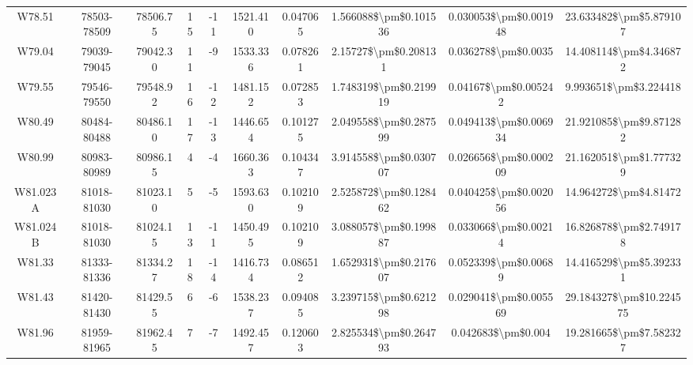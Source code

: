 \documentclass{article}
\begin{document}
\begin{table}[h]
{\begin{tabular}{|c|c|c|c|c|c|c|c|c|c|}
  W78.51 &       78503-78509 &                78506.75 &   15 &  -11 &          1521.410 & 0.047065 & 1.566088\$\textbackslash pm\$0.101536 & 0.030053\$\textbackslash pm\$0.001948 &   23.633482\$\textbackslash pm\$5.879107 \\
  W79.04 &       79039-79045 &                79042.30 &   11 &   -9 &          1533.336 & 0.078261 &  2.15727\$\textbackslash pm\$0.208131 &   0.036278\$\textbackslash pm\$0.0035 &   14.408114\$\textbackslash pm\$4.346872 \\
  W79.55 &       79546-79550 &                79548.92 &   16 &  -12 &          1481.152 & 0.072853 & 1.748319\$\textbackslash pm\$0.219919 &  0.04167\$\textbackslash pm\$0.005242 &    9.993651\$\textbackslash pm\$3.224418 \\
  W80.49 &       80484-80488 &                80486.10 &   17 &  -13 &          1446.654 & 0.101275 & 2.049558\$\textbackslash pm\$0.287599 & 0.049413\$\textbackslash pm\$0.006934 &   21.921085\$\textbackslash pm\$9.871282 \\
  W80.99 &       80983-80989 &                80986.15 &    4 &   -4 &          1660.363 & 0.104347 & 3.914558\$\textbackslash pm\$0.030707 & 0.026656\$\textbackslash pm\$0.000209 &   21.162051\$\textbackslash pm\$1.777329 \\
W81.023A &       81018-81030 &                81023.10 &    5 &   -5 &          1593.630 & 0.102109 & 2.525872\$\textbackslash pm\$0.128462 & 0.040425\$\textbackslash pm\$0.002056 &    14.964272\$\textbackslash pm\$4.81472 \\
W81.024B &       81018-81030 &                81024.15 &   13 &  -11 &          1450.495 & 0.102109 & 3.088057\$\textbackslash pm\$0.199887 &  0.033066\$\textbackslash pm\$0.00214 &   16.826878\$\textbackslash pm\$2.749178 \\
  W81.33 &       81333-81336 &                81334.27 &   18 &  -14 &          1416.734 & 0.086512 & 1.652931\$\textbackslash pm\$0.217607 &  0.052339\$\textbackslash pm\$0.00689 &   14.416529\$\textbackslash pm\$5.392331 \\
  W81.43 &       81420-81430 &                81429.55 &    6 &   -6 &          1538.237 & 0.094085 & 3.239715\$\textbackslash pm\$0.621298 & 0.029041\$\textbackslash pm\$0.005569 &  29.184327\$\textbackslash pm\$10.224575 \\
  W81.96 &       81959-81965 &                81962.45 &    7 &   -7 &          1492.457 & 0.120603 & 2.825534\$\textbackslash pm\$0.264793 &    0.042683\$\textbackslash pm\$0.004 &   19.281665\$\textbackslash pm\$7.582327 \\

\end{tabular}}
\end{table}
\end{document}
